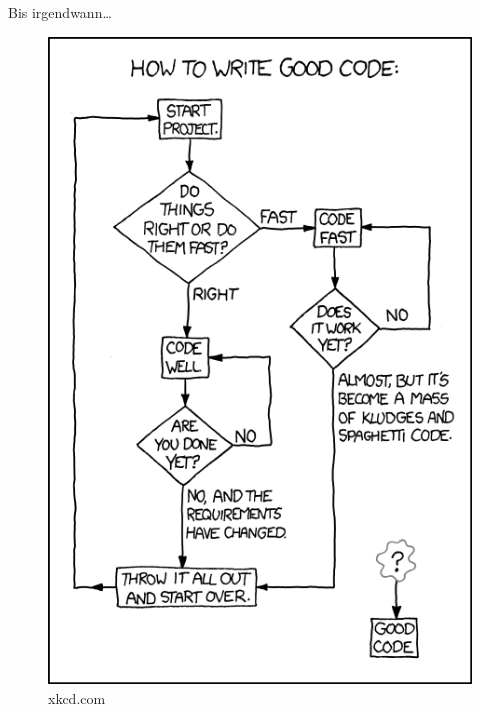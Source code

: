 \documentclass[18pt]{beamer}
\begin{document}
\begin{frame}{Bis irgendwann\dots}
    \begin{figure}
        \includegraphics[scale=.3]{img/good_code.png}
        \caption{\footnotesize{xkcd.com}}
    \end{figure}
\end{frame}

\backupend
\end{document}
